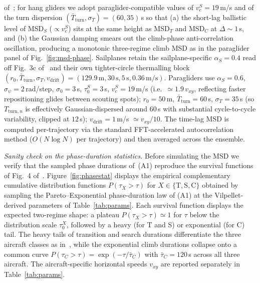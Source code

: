 \documentclass[11pt,a4paper]{article}
\begin{document}
of~\cite{vilpellet2026}; for hang gliders we adopt
paraglider-compatible values of $v_c^S = 19$\,m/s and of the
turn dispersion $(\bar{T}_{\mathrm{turn}}, \sigma_T) = (60, 35)$\,s
so that (a) the short-lag ballistic level of MSD$_S$
($\propto v_c^S$) sits at the same height as MSD$_T$ and MSD$_C$
at $\Delta \sim 1$\,s, and (b) the Gaussian damping smears out
the climb-phase anti-correlation oscillation, producing a
monotonic three-regime climb MSD as in the paraglider panel of
Fig.~\ref{fig:msd-phase}. Sailplanes retain the
sailplane-specific $\alpha_S=0.4$ read off Fig.~3c
of~\cite{vilpellet2026} and their own tighter-circle thermalling
block $(r_0, \bar{T}_{\mathrm{turn}}, \sigma_T, v_{\mathrm{drift}})
= (129.9\,\mathrm{m}, 30\,\mathrm{s}, 5\,\mathrm{s},
0.36\,\mathrm{m/s})$. Paragliders use $\alpha_S = 0.6$,
$\sigma_{\psi} = 2$\,rad/step, $\sigma_0 = 3$\,s, $\tau_0^S =
3$\,s, $v_c^S = 19$\,m/s (i.e.\ $\simeq 1.9\,v_{xy}$, reflecting
faster repositioning glides between scouting spots); $r_0 =
50$\,m, $\bar{T}_{\mathrm{turn}} = 60$\,s, $\sigma_T = 35$\,s (so
$T_{\mathrm{turn},n}$ is effectively Gaussian-dispersed around
$60$\,s with substantial cycle-to-cycle variability, clipped at
$12$\,s); $v_{\mathrm{drift}} = 1$\,m/s $\simeq v_{xy}/10$. The
time-lag MSD is computed per-trajectory via the standard
FFT-accelerated autocorrelation method ($O(N\log N)$ per
trajectory) and then averaged across the ensemble.

\emph{Sanity check on the phase-duration statistics.} Before
simulating the MSD we verify that the sampled phase durations
of~(A1) reproduce the survival functions of Fig.~4 of~\cite{vilpellet2026}.
Figure~\ref{fig:phasestat} displays the empirical complementary
cumulative distribution functions $P(\tau_X > \tau)$ for
$X\in\{\mathrm{T},\mathrm{S},\mathrm{C}\}$ obtained by sampling
the Pareto--Exponential phase-duration law of (A1) at the
Vilpellet-derived parameters of Table~\ref{tab:params}. Each
survival function displays the expected two-regime shape: a
plateau $P(\tau_X>\tau)\simeq 1$ for $\tau$ below the distribution
scale $\tau_0^X$, followed by a heavy (for T and S) or
exponential (for C) tail. The heavy tails of transition and
search durations differentiate the three aircraft classes as
in~\cite{vilpellet2026}, while the exponential climb durations
collapse onto a common curve
$P(\tau_C>\tau)=\exp(-\tau/\bar\tau_C)$ with $\bar\tau_C = 120$\,s
across all three aircraft. The aircraft-specific horizontal
speeds $v_{xy}$ are reported separately in
Table~\ref{tab:params}.
\end{document}
